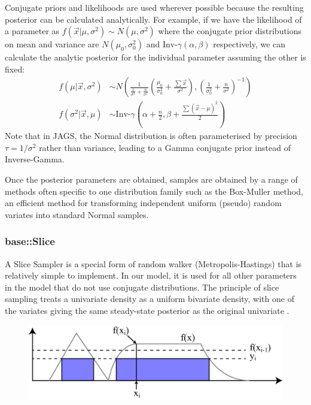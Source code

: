 \documentclass[a4paper, 12pt]{article}
\begin{document}
Conjugate priors and likelihoods are used wherever possible because the resulting posterior can be calculated analytically. For example, if we have the likelihood of a parameter as $f(\vec{x}|\mu,\sigma^2)\sim N(\mu,\sigma^2)$ where the conjugate prior distributions on mean and variance are $N(\mu_0,\sigma^2_0)$ and $\text{Inv-}\gamma(\alpha,\beta)$ respectively, we can calculate the analytic posterior for the individual parameter assuming the other is fixed:
\begin{align}
f(\mu|\vec{x},\sigma^2) &\sim N\left( \frac{1}{\frac{1}{\sigma^2} + \frac{n}{\sigma^2}} \left( \frac{\mu_0}{\sigma^2_0} + \frac{\sum\vec{x}}{\sigma^2} \right) , \left( \frac{1}{\sigma^2_0} + \frac{n}{\sigma^2} \right)^{-1} \right)\\
f(\sigma^2|\vec{x},\mu) &\sim \text{Inv-}\gamma \left( \alpha+\frac{n}{2} , \beta+\frac{\sum(\vec{x}-\mu)^2}{2} \right)
\end{align}
Note that in JAGS, the Normal distribution is often parameterised by precision $\tau = 1/\sigma^2$ rather than variance, leading to a Gamma conjugate prior instead of Inverse-Gamma.

Once the posterior parameters are obtained, samples are obtained by a range of methods often specific to one distribution family such as the Box-Muller method, an efficient method for transforming independent uniform (pseudo) random variates into standard Normal samples.

\subsubsection{base::Slice}
A Slice Sampler is a special form of random walker (Metropolis-Hastings) that is relatively simple to implement. In our model, it is used for all other parameters in the model that do not use conjugate distributions. The principle of slice sampling treats a univariate density as a uniform bivariate density, with one of the variates giving the same steady-state posterior as the original univariate \cite{Neal:2003}.

\begin{figure}
  \centering
  \includegraphics[width=0.5\linewidth]{media/slice_sampling}
  \label{fig:slice_sampling}
\end{figure}
\end{document}
